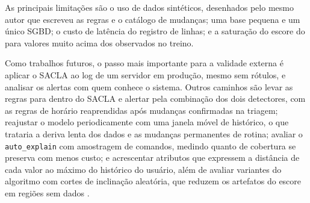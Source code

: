 As principais limitações são o uso de dados sintéticos, desenhados pelo mesmo autor que escreveu
as regras e o catálogo de mudanças; uma base pequena e um único SGBD; o custo de latência do
registro de linhas; e a saturação do escore do \iforest{} para valores muito acima dos observados
no treino.

Como trabalhos futuros, o passo mais importante para a validade externa é aplicar o SACLA ao log
de um servidor em produção, mesmo sem rótulos, e analisar os alertas com quem conhece o sistema.
Outros caminhos são levar as regras para dentro do SACLA e alertar pela combinação dos dois
detectores, com as regras de horário reaprendidas após mudanças confirmadas na triagem;
reajustar o modelo periodicamente com uma janela móvel de histórico, o que trataria a deriva
lenta dos dados e as mudanças permanentes de rotina; avaliar o \texttt{auto\_explain} com
amostragem de comandos, medindo quanto de cobertura se preserva com menos custo; e acrescentar
atributos que expressem a distância de cada valor ao máximo do histórico do usuário, além de
avaliar variantes do algoritmo com cortes de inclinação aleatória, que reduzem os artefatos do
escore em regiões sem dados \cite{hariri2021}.
